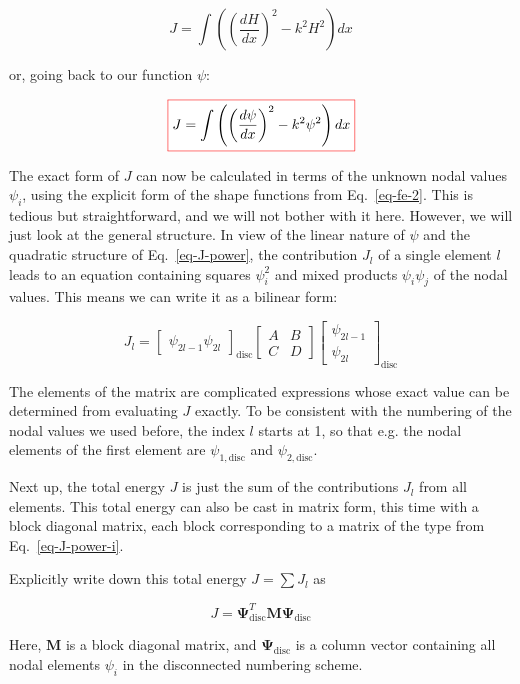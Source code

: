 \begin{equation}
J = \int \left( \left(\frac{d H}{d x}\right)^2 - k^2 H^2 \right) dx
\end{equation}

or, going back to our function $\psi$:

\begin{equation}
\fbox{$\displaystyle
J = \int \left( \left(\frac{d \psi}{d x}\right)^2 - k^2 \psi^2 \right) dx \label{eq-J-power}
$}
\end{equation} 

The exact form of $J$ can now be calculated in terms of the unknown nodal values $\psi_i$, using the explicit form of the shape functions from Eq.~\ref{eq-fe-2}. This is tedious but straightforward, and we will not bother with it here. However, we will just look at the general structure. In view of the linear nature of $\psi$ and the quadratic structure of Eq.~\ref{eq-J-power}, the contribution $J_l$ of a single element $l$ leads to an equation containing squares $\psi_i^2$ and mixed products $\psi_i \psi_j$ of the nodal values. This means we can write it as a bilinear form:

\begin{equation}
J_l = \begin{bmatrix}
\psi_{2l-1} \psi_{2l} 
\end{bmatrix}_\mathrm{disc}
\begin{bmatrix}
A & B \\
C & D 
\end{bmatrix}
\begin{bmatrix}
\psi_{2l-1} \\ \psi_{2l}
\end{bmatrix}_\mathrm{disc}
\label{eq-J-power-i}
\end{equation} 

The elements of the matrix are complicated expressions whose exact value can be determined from evaluating $J$ exactly. To be consistent with the numbering of the nodal values we used before, the index $l$ starts at 1, so that e.g. the nodal elements of the first element are $\psi_{1,\mathrm{disc}}$ and $\psi_{2,\mathrm{disc}}$.

Next up, the total energy $J$ is just the sum of the contributions $J_l$ from all elements. This total energy can also be cast in matrix form, this time with a block diagonal matrix, each block corresponding to a matrix of the type from Eq.~\ref{eq-J-power-i}.

\begin{exer}
Explicitly write down this total energy $J=\sum J_l$ as 

$$J={\mathbf \Psi}^{T}_\mathrm{disc} {\mathbf M} {\mathbf \Psi}_\mathrm{disc}
$$ 

Here, ${\mathbf M}$ is a block diagonal matrix, and ${\mathbf \Psi}_\mathrm{disc}$ is a column vector containing all nodal elements $\psi_i$ in the disconnected numbering scheme.
\end{exer}

